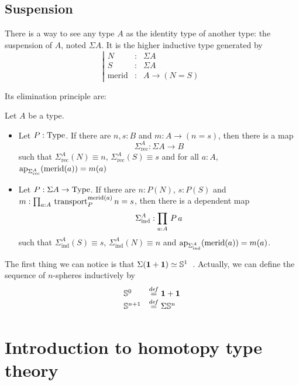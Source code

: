 \subsection{Suspension}
\label{ssec:susp}

There is a way to see any type $A$ as the identity type of another
type: the suspension of $A$, noted $\Sigma A$. It is the higher inductive type generated
by
\newcommand{\merid}{\mathrm{merid}}
\[ \left|
    \begin{array}{lll}
      N&:& \Sigma A \\
      S&:& \Sigma A\\
      \merid&:& A \to (N = S)
    \end{array}
\right. \]

Its elimination principle are:
\begin{lem}
  Let $A$ be a type.
  \begin{itemize}
  \item Let $P:\operatorname{Type}$. If there are $n,s:B$ and $m:A\to (n=s)$, then
    there is a map
    \[\Sigma^A_{\mathrm{rec}} : \Sigma A \to B\]
    such that $\Sigma^A_{\mathrm{rec}}(N) \equiv n$,
    $\Sigma^A_{\mathrm{rec}}(S)\equiv s$ and for all $a:A$,
    $\ap{\Sigma^A_{\mathrm{rec}}}(\merid(a)) = m(a)$
  \item Let $P:\Sigma A\to \operatorname{Type}$. If there are $n:P(N)$, $s:P(S)$ and
    $m:\prodD a A {\transport_P^{\merid(a)} n = s}$, then there is a
    dependent map
    \[ \Sigma^A_{\mathrm{ind}} : \prod_{a:A}\, P\, a\]
    such that $\Sigma^A_{\mathrm{ind}}(S) \equiv s$,
    $\Sigma^A_{\mathrm{ind}}(N)\equiv n$ and
    $\ap{\Sigma^A_{\mathrm{ind}}}(\merid(a)) = m(a)$.
  \end{itemize}
\end{lem}

The first thing we can notice is that $\Sigma(\mathbf{1}+\mathbf{1}) \simeq
\mathbb{S}^1$~\cite[Lemma 6.5.1]{hottbook}. Actually, we can define the
sequence of $n$-spheres inductively by
\[
  \begin{array}{ll}
    \mathbb S^0 &\overset{de\hspace{-0.2ex}f}{=} \mathbf{1}+\mathbf{1} \\
    \mathbb S^{n+1} &\overset{de\hspace{-0.2ex}f}{=} \Sigma \mathbb S^n
  \end{array}
\]

\section{Introduction to homotopy type theory}
\label{sec:hott}

